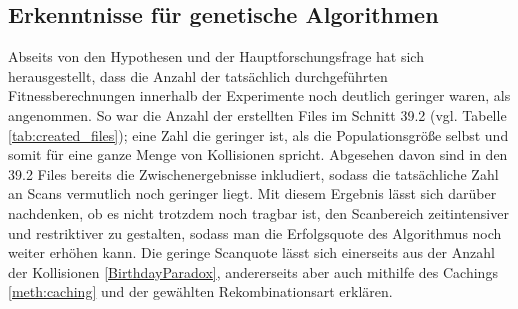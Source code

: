 \subsection{Erkenntnisse für genetische Algorithmen}
Abseits von den Hypothesen und der Hauptforschungsfrage hat sich herausgestellt, dass die Anzahl der tatsächlich durchgeführten Fitnessberechnungen innerhalb der Experimente noch deutlich geringer waren, als angenommen. So war die Anzahl der erstellten Files im Schnitt 39.2 (vgl. Tabelle \ref{tab:created_files}); eine Zahl die geringer ist, als die Populationsgröße selbst und somit für eine ganze Menge von Kollisionen spricht. Abgesehen davon sind in den 39.2 Files bereits die Zwischenergebnisse inkludiert, sodass die tatsächliche Zahl an Scans vermutlich noch geringer liegt. Mit diesem Ergebnis lässt sich darüber nachdenken, ob es nicht trotzdem noch tragbar ist, den Scanbereich zeitintensiver und restriktiver zu gestalten, sodass man die Erfolgsquote des Algorithmus noch weiter erhöhen kann. 
Die geringe Scanquote lässt sich einerseits aus der Anzahl der Kollisionen \ref{BirthdayParadox}, andererseits aber auch mithilfe des Cachings \ref{meth:caching} und der gewählten Rekombinationsart erklären.

